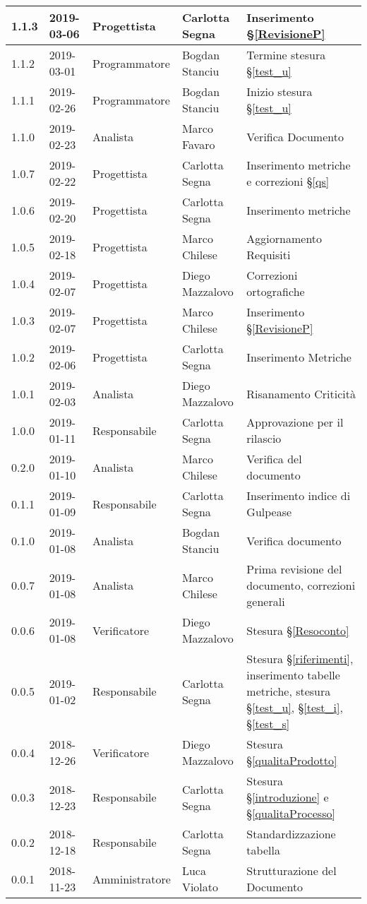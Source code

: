 \begin{center}
\begin{longtable}[c]{|m{}|m{}|m{}|m{}|p{}|}
\hline
\rowcolor{grigio}1.1.3 & 2019-03-06 & Progettista & Carlotta Segna & Inserimento §\ref{RevisioneP} \\
\hline
1.1.2 & 2019-03-01 & Programmatore & Bogdan Stanciu & Termine stesura §\ref{test_u} \\
\hline
\rowcolor{grigio}1.1.1 & 2019-02-26 & Programmatore & Bogdan Stanciu & Inizio stesura §\ref{test_u} \\
\hline
1.1.0 & 2019-02-23 & Analista & Marco Favaro & Verifica Documento\\
\hline
\rowcolor{grigio} 1.0.7 & 2019-02-22 & Progettista & Carlotta Segna & Inserimento metriche e correzioni §\ref{qs}\\
\hline
1.0.6 & 2019-02-20 & Progettista & Carlotta Segna & Inserimento metriche\\
\hline
\rowcolor{grigio} 1.0.5 & 2019-02-18 & Progettista & Marco Chilese & Aggiornamento  Requisiti\\
\hline
1.0.4 & 2019-02-07 & Progettista & Diego Mazzalovo & Correzioni ortografiche \\
\hline
\rowcolor{grigio} 1.0.3 & 2019-02-07 & Progettista & Marco Chilese & Inserimento §\ref{RevisioneP} \\
\hline
1.0.2 & 2019-02-06 & Progettista & Carlotta Segna & Inserimento Metriche \\
\hline
\rowcolor{grigio}1.0.1 & 2019-02-03 & Analista & Diego Mazzalovo & Risanamento Criticità \\
\hline 
1.0.0 & 2019-01-11 & Responsabile & Carlotta Segna & Approvazione per il rilascio\\
\hline
\rowcolor{grigio}0.2.0 & 2019-01-10 & Analista & Marco Chilese & Verifica del documento\\
\hline
0.1.1 & 2019-01-09 & Responsabile & Carlotta Segna & Inserimento indice di Gulpease \\
\hline
\rowcolor{grigio}0.1.0 & 2019-01-08 &  Analista & Bogdan Stanciu & Verifica documento \\
\hline
0.0.7 & 2019-01-08 & Analista & Marco Chilese & Prima revisione del documento, correzioni generali\\
\hline
\rowcolor{grigio}0.0.6 & 2019-01-08 & Verificatore & Diego Mazzalovo & Stesura §\ref{Resoconto}\\
\hline
0.0.5 & 2019-01-02 & Responsabile & Carlotta Segna & Stesura §\ref{riferimenti}, inserimento tabelle metriche, stesura §\ref{test_u}, §\ref{test_i}, §\ref{test_s} \\
\hline
\rowcolor{grigio} 0.0.4 & 2018-12-26 & Verificatore & Diego Mazzalovo  & Stesura §\ref{qualitaProdotto} \\
\hline
0.0.3 & 2018-12-23 & Responsabile  & Carlotta Segna & Stesura §\ref{introduzione} e §\ref{qualitaProcesso} \\
\hline
\rowcolor{grigio} 0.0.2 & 2018-12-18 & Responsabile & Carlotta Segna & Standardizzazione tabella \\
\hline
0.0.1 & 2018-11-23 & Amministratore & Luca Violato & Strutturazione del Documento \\


\end{longtable}
\end{center}
